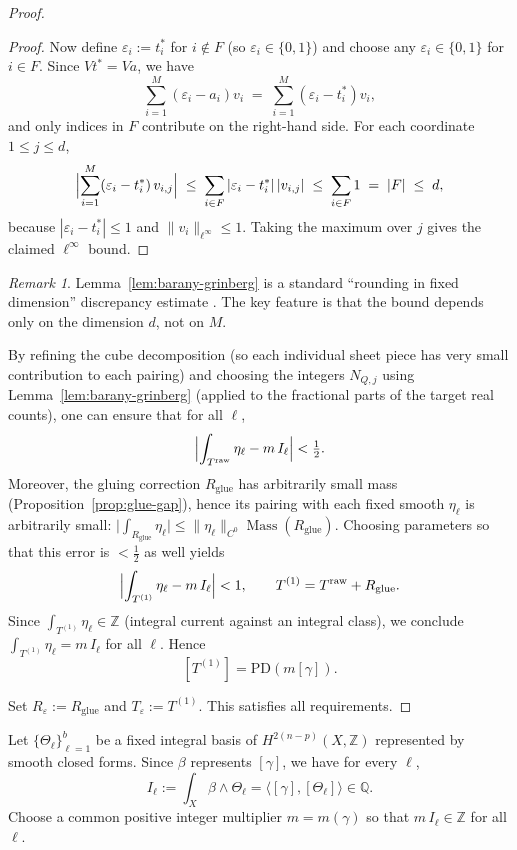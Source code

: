 \documentclass[11pt]{article}
\newcommand{\REVMZ}[1]{\textcolor{teal}{#1}}  %
\numberwithin{equation}{section}  %
\theoremstyle{plain}
\theoremstyle{definition}
\theoremstyle{remark}
\newtheorem{remark}[theorem]{Remark}
\newcommand{\Z}{\mathbb{Z}}
\newcommand{\Q}{\mathbb{Q}}
\DeclareMathOperator{\Mass}{Mass}
\begin{document}
\begin{proof}
\begin{proof}
Now define $\varepsilon_i:=t_i^*$ for $i\notin F$ (so $\varepsilon_i\in\{0,1\}$) and choose any $\varepsilon_i\in\{0,1\}$ for $i\in F$.
Since $Vt^*=Va$, we have
\[
\sum_{i=1}^M (\varepsilon_i-a_i)v_i
\;=\;
\sum_{i=1}^M (\varepsilon_i-t_i^*)v_i,
\]
and only indices in $F$ contribute on the right-hand side.
For each coordinate $1\le j\le d$,
\[
\Bigl|\sum_{i=1}^M (\varepsilon_i-t_i^*)\,v_{i,j}\Bigr|
\;\le\;
\sum_{i\in F} |\varepsilon_i-t_i^*|\,|v_{i,j}|
\;\le\;
\sum_{i\in F} 1
\;=\;
|F|
\;\le\;
d,
\]
because $|\varepsilon_i-t_i^*|\le 1$ and $\|v_i\|_{\ell^\infty}\le 1$.
Taking the maximum over $j$ gives the claimed $\ell^\infty$ bound.
\end{proof}

\begin{remark}
Lemma~\ref{lem:barany-grinberg} is a standard ``rounding in fixed dimension'' discrepancy estimate
\REVMZ{\cite{BaranyGrinberg81}}.
The key feature is that the bound depends only on the dimension $d$, not on $M$.
\end{remark}

By refining the cube decomposition (so each individual sheet piece has very small contribution
to each pairing) and choosing the integers $N_{Q,j}$ using Lemma~\ref{lem:barany-grinberg}
(applied to the fractional parts of the target real counts), one can ensure that for all $\ell$,
\[
\Bigl|\int_{T^{\mathrm{raw}}}\eta_\ell - m\,I_\ell\Bigr|<\tfrac12.
\]
Moreover, the gluing correction $R_{\mathrm{glue}}$ has arbitrarily small mass (Proposition~\ref{prop:glue-gap}), hence
its pairing with each fixed smooth $\eta_\ell$ is arbitrarily small:
$\bigl|\int_{R_{\mathrm{glue}}}\eta_\ell\bigr|\le \|\eta_\ell\|_{C^0}\Mass(R_{\mathrm{glue}})$.
Choosing parameters so that this error is $<\tfrac12$ as well yields
\[
\Bigl|\int_{T^{(1)}}\eta_\ell - m\,I_\ell\Bigr|<1,
\qquad T^{(1)}=T^{\mathrm{raw}}+R_{\mathrm{glue}}.
\]
Since $\int_{T^{(1)}}\eta_\ell\in\Z$ (integral current against an integral class),
we conclude $\int_{T^{(1)}}\eta_\ell = m\,I_\ell$ for all $\ell$.
Hence
\[
[T^{(1)}]=\mathrm{PD}(m[\gamma]).
\]

Set $R_\varepsilon:=R_{\mathrm{glue}}$ and $T_\varepsilon:=T^{(1)}$.  This satisfies all requirements.
\end{proof}

Let $\{\Theta_\ell\}_{\ell=1}^{b}$ be a fixed integral basis of
$H^{2(n-p)}(X,\Z)$ represented by smooth closed forms.  Since $\beta$
represents $[\gamma]$, we have for every $\ell$,
\[
I_\ell := \int_X \beta\wedge \Theta_\ell
= \langle [\gamma], [\Theta_\ell]\rangle \in \Q.
\]
Choose a common positive integer multiplier $m=m(\gamma)$ so that
$m\,I_\ell\in\Z$ for all $\ell$.
\end{document}
